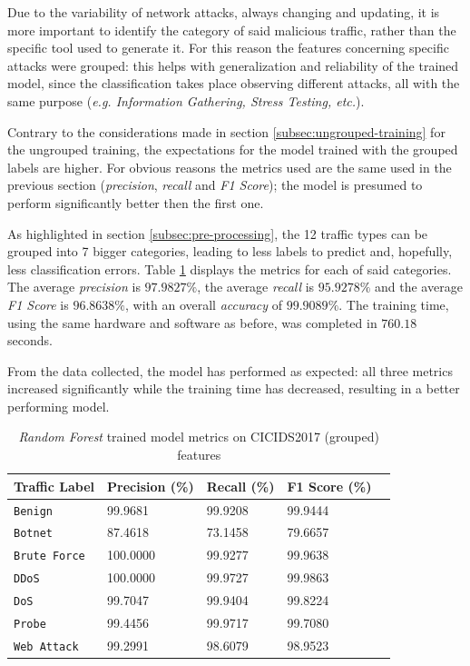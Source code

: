 Due to the variability of network attacks, always changing and updating, it is more important to identify the category of said malicious traffic, rather than the specific tool used to generate it. For this reason the features concerning specific attacks were grouped: this helps with generalization and reliability of the trained model, since the classification takes place observing different attacks, all with the same purpose (\textit{e.g. Information Gathering, Stress Testing, etc.}).
\par Contrary to the considerations made in section \ref{subsec:ungrouped-training} for the ungrouped training, the expectations for the model trained with the grouped labels are higher. For obvious reasons the metrics used are the same used in the previous section (\textit{precision}, \textit{recall} and \textit{F1 Score}); the model is presumed to perform significantly better then the first one.
\par As highlighted in section \ref{subsec:pre-processing}, the 12 traffic types can be grouped into 7 bigger categories, leading to less labels to predict and, hopefully, less classification errors. Table \ref{tab:grouped-metrics} displays the metrics for each of said categories. The average \textit{precision} is $97.9827\%$, the average \textit{recall} is $95.9278\%$ and the average \textit{F1 Score} is $96.8638\%$, with an overall \textit{accuracy} of $99.9089\%$. The training time, using the same hardware and software as before, was completed in $760.18$ seconds.
\par From the data collected, the model has performed as expected: all three metrics increased significantly while the training time has decreased, resulting in a better performing model.

\begin{table}[h!]
   \centering
   \begin{tabular}{l|llll}
       \toprule 
       Traffic Label & Precision (\%) & Recall (\%) & F1 Score (\%) \\
       \midrule
       \rowcolor{black!10} \texttt{Benign} & 99.9681 & 99.9208 & 99.9444 \\
       \texttt{Botnet} & 87.4618 & 73.1458 & 79.6657 \\
       \rowcolor{black!10} \texttt{Brute Force} & 100.0000 & 99.9277 & 99.9638 \\
       \texttt{DDoS} & 100.0000 & 99.9727 & 99.9863 \\
       \rowcolor{black!10} \texttt{DoS} & 99.7047 & 99.9404 & 99.8224 \\
       \texttt{Probe} & 99.4456 & 99.9717 & 99.7080 \\
       \rowcolor{black!10} \texttt{Web Attack} & 99.2991 & 98.6079 & 98.9523 \\
       \bottomrule
   \end{tabular}
   \caption{\textit{Random Forest} trained model metrics on CICIDS2017 (grouped) features}
   \label{tab:grouped-metrics}
\end{table}

